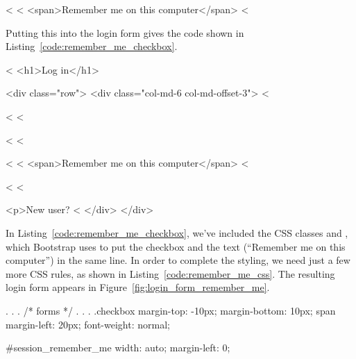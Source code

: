 \begin{code}
<%
  <%
  <span>Remember me on this computer</span>
<%
\end{code}

\noindent Putting this into the login form gives the code shown in Listing~\ref{code:remember_me_checkbox}.

\begin{codelisting}
\label{code:remember_me_checkbox}
\begin{code}
<%
<h1>Log in</h1>

<div class="row">
  <div class="col-md-6 col-md-offset-3">
    <%

      <%
      <%

      <%
      <%

      <%
        <%
        <span>Remember me on this computer</span>
      <%

      <%
    <%

    <p>New user? <%
  </div>
</div>
\end{code}
\end{codelisting}

In Listing~\ref{code:remember_me_checkbox}, we've included the CSS classes  and , which Bootstrap uses to put the checkbox and the text (``Remember me on this computer'') in the same line. In order to complete the styling, we need just a few more CSS rules, as shown in Listing~\ref{code:remember_me_css}. The resulting login form appears in Figure~\ref{fig:login_form_remember_me}.

\begin{codelisting}
\label{code:remember_me_css}
\begin{code}
.
.
.
/* forms */
.
.
.
.checkbox {
  margin-top: -10px;
  margin-bottom: 10px;
  span {
    margin-left: 20px;
    font-weight: normal;
  }
}

#session_remember_me {
  width: auto;
  margin-left: 0;
}
\end{code}
\end{codelisting}


